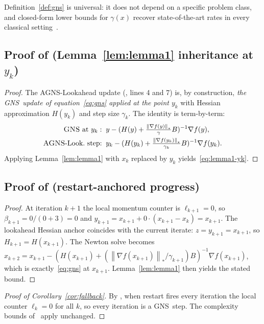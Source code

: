 \documentclass[conference]{IEEEtran}
\theoremstyle{remark}
\newcommand{\dnorm}[1]{\left\lVert#1\right\rVert_*}
\newcommand{\AGNS}{\textsc{AGNS}}
\newcommand{\GNS}{\textsc{GNS}}
\begin{document}
Definition~\ref{def:gns} is universal: it does not depend on a specific
problem class, and closed-form lower bounds for $\gamma(x)$ recover
state-of-the-art rates in every classical
setting~\cite{semenov2025gradient}.

\subsection{Proof of  (Lemma~\ref{lem:lemma1} inheritance at $y_k$)}

\begin{proof}
The \AGNS-Lookahead update (, lines 4 and 7) is, by
construction, \emph{the \GNS\ update of equation~\eqref{eq:gns}
applied at the point $y_k$} with Hessian approximation $H(y_k)$ and
step size $\gamma_k$. The identity is term-by-term:
\begin{align*}
\text{\GNS\ at } y_k:\;\; & y - (H(y) + \tfrac{\dnorm{\nabla f(y)}}{\gamma} B)^{-1} \nabla f(y), \\
\text{\AGNS-Look.\ step:}\;\; & y_k - (H(y_k) + \tfrac{\dnorm{\nabla f(y_k)}}{\gamma_k} B)^{-1} \nabla f(y_k).
\end{align*}
Applying Lemma~\ref{lem:lemma1} with $x_k$ replaced by $y_k$
yields~\eqref{eq:lemma1-yk}.
\end{proof}

\subsection{Proof of  (restart-anchored progress)}

\begin{proof}
At iteration $k{+}1$ the local momentum counter is $\ell_{k+1} = 0$,
so $\beta_{k+1} = 0/(0+3) = 0$ and $y_{k+1} = x_{k+1} + 0 \cdot
(x_{k+1} - x_k) = x_{k+1}$. The lookahead Hessian anchor coincides
with the current iterate: $z = y_{k+1} = x_{k+1}$, so $H_{k+1} =
H(x_{k+1})$. The Newton solve becomes
$x_{k+2} = x_{k+1} - (H(x_{k+1}) + (\dnorm{\nabla f(x_{k+1})}/\gamma_{k+1})B)^{-1}
\nabla f(x_{k+1})$, which is exactly~\eqref{eq:gns} at $x_{k+1}$.
Lemma~\ref{lem:lemma1} then yields the stated bound.
\end{proof}

\begin{proof}[Proof of Corollary~\ref{cor:fallback}]
By , when restart fires every iteration
the local counter $\ell_k = 0$ for all $k$, so every iteration is a
\GNS\ step. The complexity bounds
of~\cite[Thm.~1, Thm.~2]{semenov2025gradient} apply unchanged.
\end{proof}
\end{document}
